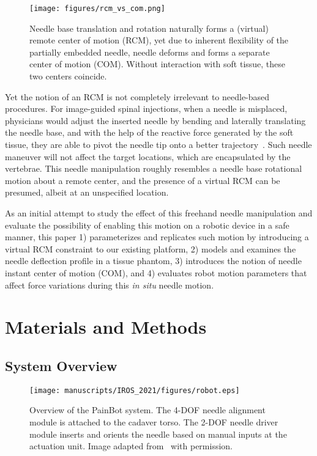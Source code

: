 \begin{figure}[tb]
  \centering
  \texttt{[image: figures/rcm\_vs\_com.png]}
  \caption{Needle base translation and rotation naturally forms a (virtual) remote center of motion (RCM), yet due to inherent flexibility of the partially embedded needle, needle deforms and forms a separate center of motion (COM). Without interaction with soft tissue, these two centers coincide.}
  \label{fig:rcm-vs-com}
\end{figure}

Yet the notion of an RCM is not completely irrelevant to needle-based procedures. For image-guided spinal injections, when a needle is misplaced, physicians would adjust the inserted needle by bending and laterally translating the needle base, and with the help of the reactive force generated by the soft tissue, they are able to pivot the needle tip onto a better trajectory~\parencite{fritzAugmentedRealityVisualization2012}. Such needle maneuver will not affect the target locations, which are encapsulated by the vertebrae. This needle manipulation roughly resembles a needle base rotational motion about a remote center, and the presence of a virtual RCM can be presumed, albeit at an unspecified location.

As an initial attempt to study the effect of this freehand needle manipulation and evaluate the possibility of enabling this motion on a robotic device in a safe manner, this paper 1) parameterizes and replicates such motion by introducing a virtual RCM constraint to our existing platform, 2) models and examines the needle deflection profile in a tissue phantom, 3) introduces the notion of needle instant center of motion (COM), and 4) evaluates robot motion parameters that affect force variations during this \textit{in situ} needle motion.

\section{Materials and Methods}
\label{sec:chap-2-material-and-methods}

\subsection{System Overview}
\label{sec:chap-2-system-overview}

\begin{figure}[tb]
  \centering
  \texttt{[image: manuscripts/IROS\_2021/figures/robot.eps]}
  \caption{Overview of the PainBot system. The 4-DOF needle alignment module is attached to the cadaver torso. The 2-DOF needle driver module inserts and orients the needle based on manual inputs at the actuation unit. Image adapted from~\parencite{liFullyActuatedBodyMounted2020} with permission.}
  \label{fig:painbot_overview}
\end{figure}

